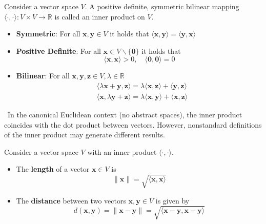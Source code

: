 \begin{minipage}{0.48\textwidth}
	Consider a vector space $V$. A positive definite, symmetric bilinear mapping $\langle\cdot, \cdot\rangle: V \times V \rightarrow \mathbb{R}$ is called an inner product on $V$. 
	\vspace{0.10cm}
	\begin{itemize}
		\item \textbf{Symmetric}: For all $\boldsymbol{x}, \boldsymbol{y} \in V$ it holds that $\langle\boldsymbol{x}, \boldsymbol{y}\rangle=\langle\boldsymbol{y}, \boldsymbol{x}\rangle$
		\item \textbf{Positive Definite}: For all $\boldsymbol{x} \in V \backslash\{\mathbf{0}\}$ it holds that
		      \[
		      	\langle\boldsymbol{x}, \boldsymbol{x}\rangle>0, \quad\langle\mathbf{0}, \mathbf{0}\rangle=0
		      \]
		\item \textbf{Bilinear}: For all $\boldsymbol{x}, \boldsymbol{y}, \boldsymbol{z} \in V, \lambda \in \mathbb{R}$
		      \[
		      	\begin{aligned}
		      		  & \langle\lambda \boldsymbol{x}+\boldsymbol{y}, \boldsymbol{z}\rangle=\lambda\langle\boldsymbol{x}, \boldsymbol{z}\rangle+\langle\boldsymbol{y}, \boldsymbol{z}\rangle \\
		      		  & \langle\boldsymbol{x}, \lambda \boldsymbol{y}+\boldsymbol{z}\rangle=\lambda\langle\boldsymbol{x}, \boldsymbol{y}\rangle+\langle\boldsymbol{x}, \boldsymbol{z}\rangle 
		      	\end{aligned}
		      \]
	\end{itemize}
	
	{\small \faLightbulb} \ In the canonical Euclidean context (no abstract spaces), the inner product coincides with the dot product between vectors. However, nonstandard definitions of the inner product may generate different results.
	
	\divider
	
	
	Consider a vector space $V$ with an inner product $\langle\cdot, \cdot\rangle$. \\
	
	\begin{itemize}
		\item The \textbf{length} of a vector $\boldsymbol{x} \in V$ is
		      \[
		      	\|\boldsymbol{x}\|=\sqrt{\langle \boldsymbol{x}, \boldsymbol{x}\rangle}
		      \]
		\item The \textbf{distance} between two vectors $\boldsymbol{x}, \boldsymbol{y} \in V$ is given by
		      \[
		      	d(\boldsymbol{x}, \boldsymbol{y})=\|\boldsymbol{x}-\boldsymbol{y}\|=\sqrt{\langle \boldsymbol{x}-\boldsymbol{y}, \boldsymbol{x}-\boldsymbol{y}\rangle}
		      \]
	\end{itemize}
	

\end{minipage}
